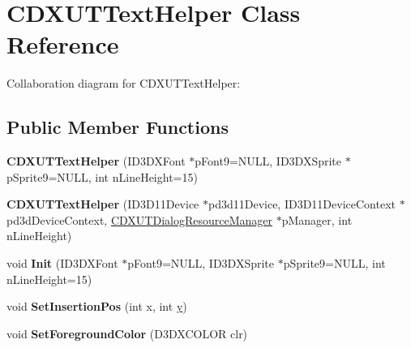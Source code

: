 \hypertarget{class_c_d_x_u_t_text_helper}{\section{C\+D\+X\+U\+T\+Text\+Helper Class Reference}
\label{class_c_d_x_u_t_text_helper}
}


Collaboration diagram for C\+D\+X\+U\+T\+Text\+Helper\+:
\subsection*{Public Member Functions}
\begin{DoxyCompactItemize}
\item 
\hypertarget{class_c_d_x_u_t_text_helper_a337cb0bb6a0a4eadee271527d80f7dce}{{\bfseries C\+D\+X\+U\+T\+Text\+Helper} (I\+D3\+D\+X\+Font $\ast$p\+Font9=N\+U\+L\+L, I\+D3\+D\+X\+Sprite $\ast$p\+Sprite9=N\+U\+L\+L, int n\+Line\+Height=15)}\label{class_c_d_x_u_t_text_helper_a337cb0bb6a0a4eadee271527d80f7dce}

\item 
\hypertarget{class_c_d_x_u_t_text_helper_a7734ed93723872d809b2d5d45f99c1d7}{{\bfseries C\+D\+X\+U\+T\+Text\+Helper} (I\+D3\+D11\+Device $\ast$pd3d11\+Device, I\+D3\+D11\+Device\+Context $\ast$pd3d\+Device\+Context, \hyperlink{class_c_d_x_u_t_dialog_resource_manager}{C\+D\+X\+U\+T\+Dialog\+Resource\+Manager} $\ast$p\+Manager, int n\+Line\+Height)}\label{class_c_d_x_u_t_text_helper_a7734ed93723872d809b2d5d45f99c1d7}

\item 
\hypertarget{class_c_d_x_u_t_text_helper_a8132fba25d768839bb65c32fa055e476}{void {\bfseries Init} (I\+D3\+D\+X\+Font $\ast$p\+Font9=N\+U\+L\+L, I\+D3\+D\+X\+Sprite $\ast$p\+Sprite9=N\+U\+L\+L, int n\+Line\+Height=15)}\label{class_c_d_x_u_t_text_helper_a8132fba25d768839bb65c32fa055e476}

\item 
\hypertarget{class_c_d_x_u_t_text_helper_afa59908c522b99f026652c12344d0a45}{void {\bfseries Set\+Insertion\+Pos} (int x, int \hyperlink{_ice_utils_8h_aa7ffaed69623192258fb8679569ff9ba}{y})}\label{class_c_d_x_u_t_text_helper_afa59908c522b99f026652c12344d0a45}

\item 
\hypertarget{class_c_d_x_u_t_text_helper_a9ae933e832dddf394737b7e6c5b970d2}{void {\bfseries Set\+Foreground\+Color} (D3\+D\+X\+C\+O\+L\+O\+R clr)}\label{class_c_d_x_u_t_text_helper_a9ae933e832dddf394737b7e6c5b970d2}


\end{DoxyCompactItemize}
